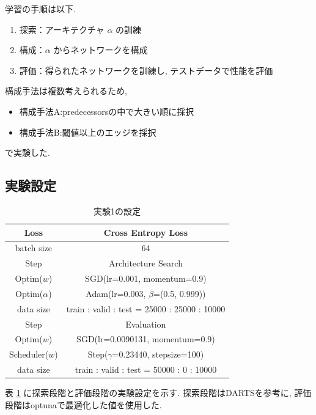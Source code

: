 \documentclass[twocolumn]{jarticle}     %
\begin{document}
学習の手順は以下.
\begin{enumerate}
  \item 探索：アーキテクチャ $\alpha$ の訓練
  \item 構成：$\alpha$ からネットワークを構成
  \item 評価：得られたネットワークを訓練し, テストデータで性能を評価
\end{enumerate}

構成手法は複数考えられるため,
\begin{itemize}
  \item 構成手法A:predecessorsの中で大きい順に採択
  \item 構成手法B:閾値以上のエッジを採択
\end{itemize}
で実験した.

\subsection{実験設定}

\begin{table}[tb]
  \begin{center}
    \caption{実験1の設定}
    \begin{tabular}{|c|c|} \hline
      Loss & Cross Entropy Loss \\ \hline
      batch size & 64 \\ \hline\hline
      Step & Architecture Search \\ \hline
      Optim($w$) & SGD(lr=0.001, momentum=0.9) \\ \hline
      Optim($\alpha$) & Adam(lr=0.003, $\beta$=(0.5, 0.999)) \\ \hline
      data size & train : valid : test = 25000 : 25000 : 10000\\ \hline\hline
      Step & Evaluation \\ \hline
      Optim($w$) & SGD(lr=0.0090131, momentum=0.9) \\ \hline
      Scheduler($w$) & Step($\gamma$=0.23440, stepsize=100) \\ \hline
      data size & train : valid : test = 50000 : 0 : 10000\\ \hline
    \end{tabular}
    \label{tab:setting1}
  \end{center}
\end{table}

表 \ref{tab:setting1} に探索段階と評価段階の実験設定を示す.
探索段階はDARTSを参考に, 評価段階はoptunaで最適化した値を使用した.
\end{document}
